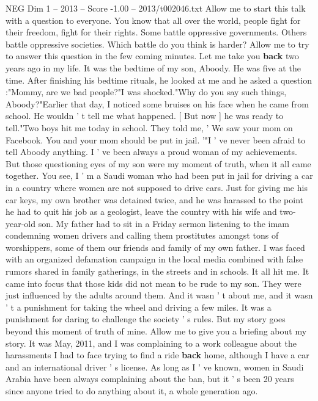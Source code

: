 \begin{textsample}{NEG Dim 1 – 2013 – Score -1.00 – 2013/t002046.txt}  \label{ex:f1_neg_037}
Allow me to start this talk with a question to everyone.
You know that all over the world, people fight for their freedom, fight for their rights.
Some battle oppressive governments.
Others battle oppressive societies.
Which battle do you think is harder?
Allow me to try to answer this question in the few coming minutes.
Let me take you \textbf{back} two years ago in my life.
It was the bedtime of my son, Aboody.
He was five at the time.
After finishing his bedtime rituals, he looked at me and he asked a question :"Mommy, are we bad people?"I was shocked."Why do you say such things, Aboody?"Earlier that day, I noticed some bruises on his face when he came from school.
He wouldn ' t tell me what happened. [ But now ] he was ready to tell."Two boys hit me today in school.
They told me, ' We saw your mom on Facebook.
You and your mom should be put in jail. '"I ' ve never been afraid to tell Aboody anything.
I ' ve been always a proud woman of my achievements.
But those questioning eyes of my son were my moment of truth, when it all came together.
You see, I ' m a Saudi woman who had been put in jail for driving a car in a country where women are not supposed to drive cars.
Just for giving me his car keys, my own brother was detained twice, and he was harassed to the point he had to quit his job as a geologist, leave the country with his wife and two-year-old son.
My father had to sit in a Friday sermon listening to the imam condemning women drivers and calling them prostitutes amongst tons of worshippers, some of them our friends and family of my own father.
I was faced with an organized defamation campaign in the local media combined with false rumors shared in family gatherings, in the streets and in schools.
It all hit me.
It came into focus that those kids did not mean to be rude to my son.
They were just influenced by the adults around them.
And it wasn ' t about me, and it wasn ' t a punishment for taking the wheel and driving a few miles.
It was a punishment for daring to challenge the society ' s rules.
But my story goes beyond this moment of truth of mine.
Allow me to give you a briefing about my story.
It was May, 2011, and I was complaining to a work colleague about the harassments I had to face trying to find a ride \textbf{back} home, although I have a car and an international driver ' s license.
As long as I ' ve known, women in Saudi Arabia have been always complaining about the ban, but it ' s been 20 years since anyone tried to do anything about it, a whole generation ago.

\end{textsample}
